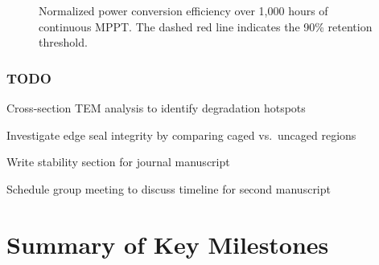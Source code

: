 \documentclass[
    language=english,
    doctype=research-notebook,
    institution=none,
]{../../omnilatex}
\begin{document}
\begin{figure}[htbp]
    \centering
    \caption{Normalized power conversion efficiency over 1,000 hours of
             continuous MPPT. The dashed red line indicates the 90\%
             retention threshold.}
    \label{fig:stability}
\end{figure}

\subsubsection{TODO}
\begin{todo}
    \item Cross-section TEM analysis to identify degradation hotspots
    \item Investigate edge seal integrity by comparing caged vs.\ uncaged regions
    \item Write stability section for journal manuscript
    \item Schedule group meeting to discuss timeline for second manuscript
\end{todo}

\section{Summary of Key Milestones}
\label{sec:milestones}
\end{document}
